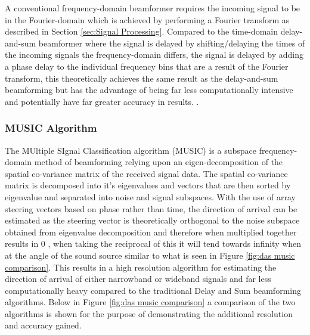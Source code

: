 \documentclass{UoNMCHA}
\numberwithin{equation}{section}
\begin{document}
    A conventional frequency-domain beamformer requires the incoming signal to be in the Fourier-domain which is achieved by performing a Fourier transform as described in Section \ref{sec:Signal Processing}. Compared to the time-domain delay-and-sum beamformer where the signal is delayed by shifting/delaying the times of the incoming signals the frequency-domain differs, the signal is delayed by adding a phase delay to the individual frequency bins that are a result of the Fourier transform, this theoretically achieves the same result as the delay-and-sum beamforming but has the advantage of being far less computationally intensive and potentially have far greater accuracy in results. \citep{Kri13}.

\subsubsection{MUSIC Algorithm} \label{sec:Intro MUSIC}
    The MUltiple SIgnal Classification algorithm (MUSIC) is a subspace frequency-domain method of beamforming relying upon an eigen-decomposition of the spatial co-variance matrix of the received signal data. The spatial co-variance matrix is decomposed into it's eigenvalues and vectors that are then sorted by eigenvalue and separated into noise and signal subspaces.
    With the use of array steering vectors based on phase rather than time, the direction of arrival can be estimated as the steering vector is theoretically orthogonal to the noise subspace obtained from eigenvalue decomposition and therefore when multiplied together results in 0 \citep{Pau} \citep{MatL}, when taking the reciprocal of this it will tend towards infinity when at the angle of the sound source similar to what is seen in Figure \ref{fig:das music comparison}. This results in a high resolution algorithm for estimating the direction of arrival of either narrowband or wideband signals and far less computationally heavy compared to the traditional Delay and Sum beamforming algorithms. Below in Figure \ref{fig:das music comparison} a comparison of the two algorithms is shown for the purpose of demonstrating the additional resolution and accuracy gained. 

\end{document}
